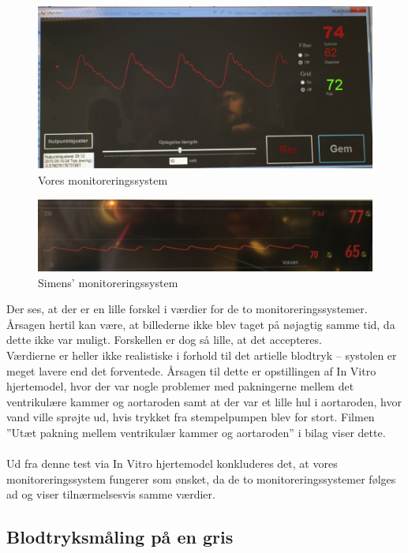 \begin{figure}[H]
	\centering
	\includegraphics[width=1\textwidth]{Figurer/Snip20151214_99}
	\caption{Vores monitoreringssystem}
\end{figure}

\begin{figure}[H]
	\centering
	\includegraphics[width=1\textwidth]{Figurer/Snip20151214_100}
	\caption{Simens' monitoreringssystem}
\end{figure}

Der ses, at der er en lille forskel i værdier for de to monitoreringssystemer. Årsagen hertil kan være, at billederne ikke blev taget på nøjagtig samme tid, da dette ikke var muligt. Forskellen er dog så lille, at det accepteres. \\
Værdierne er heller ikke realistiske i forhold til det artielle blodtryk – systolen er meget lavere end det forventede. Årsagen til dette er opstillingen af In Vitro hjertemodel, hvor der var nogle problemer med pakningerne mellem det ventrikulære kammer og aortaroden samt at der var et lille hul i aortaroden, hvor vand ville sprøjte ud, hvis trykket fra stempelpumpen blev for stort.  Filmen ”Utæt pakning mellem ventrikulær kammer og aortaroden” i bilag viser dette.
\\\\

Ud fra denne test via In Vitro hjertemodel konkluderes det, at vores monitoreringssystem fungerer som ønsket, da de to monitoreringssystemer følges ad og viser tilnærmelsesvis samme værdier.

\subsection{Blodtryksmåling på en gris} 


